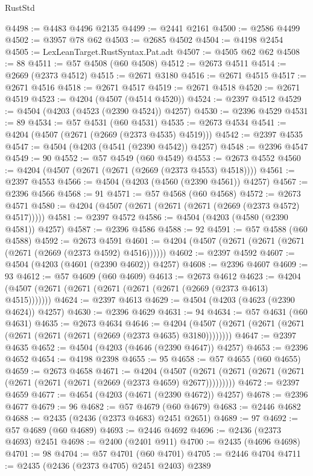 \begin{lexlean}{RustStd}
\begin{coremodule}
@4498 := @4483 @4496 @2135
@4499 := @2441 @2161
@4500 := @2586 @4499
@4502 := @3957 @78 @62
@4503 := @2685 @4502
@4504 := @4198 @2454
@4505 := LexLeanTarget.RustSyntax.Pat.adt
@4507 := @4505 @62 @62
@4508 := 88
@4511 := @57 @4508 (@60 @4508)
@4512 := @2673 @4511
@4514 := @2669 (@2373 @4512)
@4515 := @2671 @3180
@4516 := @2671 @4515
@4517 := @2671 @4516
@4518 := @2671 @4517
@4519 := @2671 @4518
@4520 := @2671 @4519
@4523 := @4204 (@4507 (@4514 @4520))
@4524 := @2397 @4512
@4529 := @4504 (@4203 (@4523 (@2390 @4524)) @4257)
@4530 := @2396 @4529
@4531 := 89
@4534 := @57 @4531 (@60 @4531)
@4535 := @2673 @4534
@4541 := @4204 (@4507 (@2671 (@2669 (@2373 @4535) @4519)))
@4542 := @2397 @4535
@4547 := @4504 (@4203 (@4541 (@2390 @4542)) @4257)
@4548 := @2396 @4547
@4549 := 90
@4552 := @57 @4549 (@60 @4549)
@4553 := @2673 @4552
@4560 := @4204 (@4507 (@2671 (@2671 (@2669 (@2373 @4553) @4518))))
@4561 := @2397 @4553
@4566 := @4504 (@4203 (@4560 (@2390 @4561)) @4257)
@4567 := @2396 @4566
@4568 := 91
@4571 := @57 @4568 (@60 @4568)
@4572 := @2673 @4571
@4580 := @4204 (@4507 (@2671 (@2671 (@2671 (@2669 (@2373 @4572) @4517)))))
@4581 := @2397 @4572
@4586 := @4504 (@4203 (@4580 (@2390 @4581)) @4257)
@4587 := @2396 @4586
@4588 := 92
@4591 := @57 @4588 (@60 @4588)
@4592 := @2673 @4591
@4601 := @4204 (@4507 (@2671 (@2671 (@2671 (@2671 (@2669 (@2373 @4592) @4516))))))
@4602 := @2397 @4592
@4607 := @4504 (@4203 (@4601 (@2390 @4602)) @4257)
@4608 := @2396 @4607
@4609 := 93
@4612 := @57 @4609 (@60 @4609)
@4613 := @2673 @4612
@4623 := @4204 (@4507 (@2671 (@2671 (@2671 (@2671 (@2671 (@2669 (@2373 @4613) @4515)))))))
@4624 := @2397 @4613
@4629 := @4504 (@4203 (@4623 (@2390 @4624)) @4257)
@4630 := @2396 @4629
@4631 := 94
@4634 := @57 @4631 (@60 @4631)
@4635 := @2673 @4634
@4646 := @4204 (@4507 (@2671 (@2671 (@2671 (@2671 (@2671 (@2671 (@2669 (@2373 @4635) @3180))))))))
@4647 := @2397 @4635
@4652 := @4504 (@4203 (@4646 (@2390 @4647)) @4257)
@4653 := @2396 @4652
@4654 := @4198 @2398
@4655 := 95
@4658 := @57 @4655 (@60 @4655)
@4659 := @2673 @4658
@4671 := @4204
    (@4507 (@2671 (@2671 (@2671 (@2671 (@2671 (@2671 (@2671 (@2669 (@2373 @4659) @2677)))))))))
@4672 := @2397 @4659
@4677 := @4654 (@4203 (@4671 (@2390 @4672)) @4257)
@4678 := @2396 @4677
@4679 := 96
@4682 := @57 @4679 (@60 @4679)
@4683 := @2446 @4682
@4688 := @2435 (@2436 (@2373 @4683) @2451 @2651)
@4689 := 97
@4692 := @57 @4689 (@60 @4689)
@4693 := @2446 @4692
@4696 := @2436 (@2373 @4693) @2451
@4698 := @2400 (@2401 @911)
@4700 := @2435 (@4696 @4698)
@4701 := 98
@4704 := @57 @4701 (@60 @4701)
@4705 := @2446 @4704
@4711 := @2435 (@2436 (@2373 @4705) @2451 @2403) @2389

\end{coremodule}
\end{lexlean}
